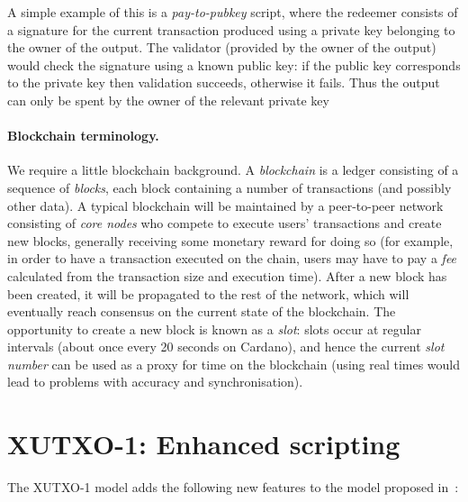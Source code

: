 \documentclass[a4paper]{article}
\renewcommand{\i}{\textit}  %
\theoremstyle{definition}  %
\begin{document}
A simple example of this is a \i{pay-to-pubkey} script, where the
redeemer consists of a signature for the current transaction produced
using a private key belonging to the owner of the output.  The
validator (provided by the owner of the output) would check the
signature using a known public key: if the public key corresponds to
the private key then validation succeeds, otherwise it fails.  Thus
the output can only be spent by the owner of the relevant private key

\paragraph{Blockchain terminology.}
\label{sec:blockchain-terminology}
We require a little blockchain background. A \textit{blockchain} is a
ledger consisting of a sequence of \textit{blocks}, each block
containing a number of transactions (and possibly other data).  A
typical blockchain will be maintained by a peer-to-peer network
consisting of \textit{core nodes} who compete to execute users'
transactions and create new blocks, generally receiving some monetary
reward for doing so (for example, in order to have a transaction
executed on the chain, users may have to pay a \textit{fee} calculated
from the transaction size and execution time). After a new block has
been created, it will be propagated to the rest of the network, which
will eventually reach consensus on the current state of the
blockchain.  The opportunity to create a new block is known as a
\textit{slot}: slots occur at regular intervals (about once every 20
seconds on Cardano), and hence the current \textit{slot number} can be
used as a proxy for time on the blockchain (using real times would
lead to problems with accuracy and synchronisation).


\section{XUTXO-1: Enhanced scripting}
\label{sec:xutxo-1}
The XUTXO-1 model adds the following new features to the model 
proposed in~\cite{Zahnentferner18-UTxO}:
\end{document}
